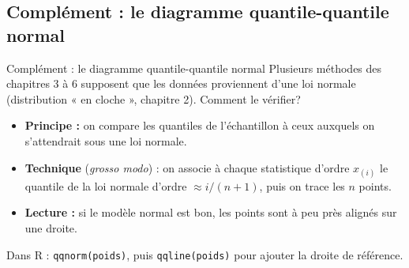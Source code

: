 \documentclass{BeamerTemplate}
\begin{document}
\subsection{Complément : le diagramme quantile-quantile normal}

\begin{frame}[t]{Complément : le diagramme quantile-quantile normal}
  Plusieurs méthodes des chapitres 3 à 6 supposent que les données
  proviennent d'une \alert{loi normale} (distribution « en cloche »,
  chapitre 2). Comment le vérifier?

  \begin{itemize}\itemsep 2mm
    \item \textbf{Principe :} on compare les quantiles de l'échantillon à
      ceux auxquels on s'attendrait sous une loi normale.
    \item \textbf{Technique} (\emph{grosso modo}) : on associe à chaque
      statistique d'ordre $x_{(i)}$ le quantile de la loi normale d'ordre
      $\approx i/(n+1)$, puis on trace les $n$ points.
    \item \textbf{Lecture :} si le modèle normal est bon, les points sont
      à peu près \alert{alignés} sur une droite.
  \end{itemize}

  \medskip

  Dans R : \texttt{qqnorm(poids)}, puis \texttt{qqline(poids)} pour ajouter
  la droite de référence.

\end{frame}
\end{document}
